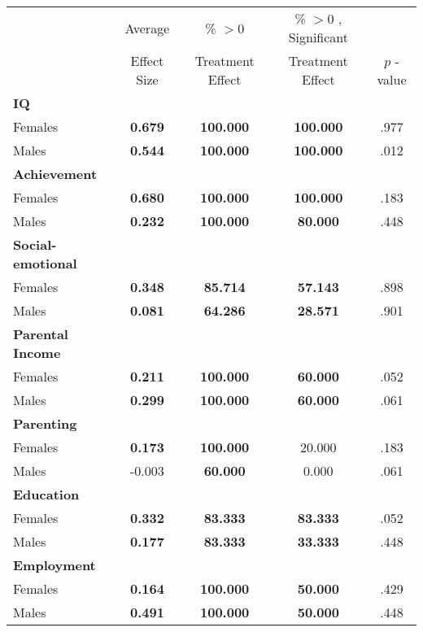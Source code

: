 \begin{tabular}{l c c c c}
\toprule
 & Average & \% $ >0 $ & \% $ >0 $ , Significant & \citet{Rosenbaum_2005_Distribution_JRSS} \\
 & Effect Size & Treatment Effect & Treatment Effect & $ p $ -value \\
\midrule
\textbf{IQ} & & & & \\
\quad Females &  \textbf{    0.679} & \textbf{  100.000} & \textbf{  100.000} & .977 \\
\quad Males &  \textbf{    0.544} & \textbf{  100.000} & \textbf{  100.000} & .012 \\
\midrule
\textbf{Achievement} & & & & \\
\quad Females &  \textbf{    0.680} & \textbf{  100.000} & \textbf{  100.000} & .183 \\
\quad Males &  \textbf{    0.232} & \textbf{  100.000} & \textbf{   80.000} & .448 \\
\midrule
\textbf{Social-emotional} & & & & \\
\quad Females &  \textbf{    0.348} & \textbf{   85.714} & \textbf{   57.143} & .898 \\
\quad Males &  \textbf{    0.081} & \textbf{   64.286} & \textbf{   28.571} & .901 \\
\midrule
\textbf{Parental Income} & & & & \\
\quad Females &  \textbf{    0.211} & \textbf{  100.000} & \textbf{   60.000} & .052 \\
\quad Males &  \textbf{    0.299} & \textbf{  100.000} & \textbf{   60.000} & .061 \\
\midrule
\textbf{Parenting} & & & & \\
\quad Females &  \textbf{    0.173} & \textbf{  100.000} &    20.000 & .183 \\
\quad Males &     -0.003 & \textbf{   60.000} &     0.000 & .061 \\
\midrule
\textbf{Education} & & & & \\
\quad Females &  \textbf{    0.332} & \textbf{   83.333} & \textbf{   83.333} & .052 \\
\quad Males &  \textbf{    0.177} & \textbf{   83.333} & \textbf{   33.333} & .448 \\
\midrule
\textbf{Employment} & & & & \\
\quad Females &  \textbf{    0.164} & \textbf{  100.000} & \textbf{   50.000} & .429 \\
\quad Males &  \textbf{    0.491} & \textbf{  100.000} & \textbf{   50.000} & .448 \\

\end{tabular}
